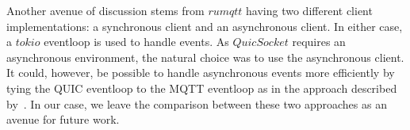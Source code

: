 Another avenue of discussion stems from $rumqtt$ having two different client implementations: a synchronous client and an asynchronous client.
In either case, a $tokio$ eventloop is used to handle events.
As $QuicSocket$ requires an asynchronous environment, the natural choice was to use the asynchronous client.
It could, however, be possible to handle asynchronous events more efficiently by tying the QUIC eventloop to the MQTT eventloop as in the approach described by~\cite{kumar_implementation_2019}.
In our case, we leave the comparison between these two approaches as an avenue for future work.
